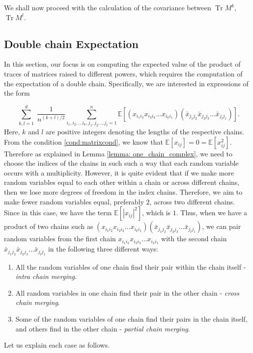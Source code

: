 \documentclass[12pt]{amsart}
\theoremstyle{plain}
\theoremstyle{definition}
\newcommand{\Tr}{\operatorname{Tr}}
\begin{document}
We shall now proceed with the calculation of the covariance between $\Tr M^{k}$, $\Tr M^{l}.$


\subsection{Double chain Expectation}\label{sec: double chain expectation}
In this section, our focus is on computing the expected value of the product of traces of matrices raised to different powers, which requires the computation of the expectation of a double chain. Specifically, we are interested in expressions of the form

$$
\sum_{\substack{ k,l=1 }}^d \frac{1}{n^{(k+l)/2}} \sum_{{i_{1},i_{2},\dots i_{k} , j_{1}, j_{2}, \dots j_{l}=1}}^{n} \mathbb{E}\left[(x_{i_{1}i_{2}}x_{i_{2}i_{3}}\dots x_{i_{k}i_{1}})(\bar x_{j_{1}j_{2}}\bar x_{j_{2}j_{3}}\dots \bar x_{j_{l}j_{1}})\right].
$$
Here, $k$ and $l$ are positive integers denoting the lengths of the respective chains. From the condition \ref{cond:matrixcond}, we know that $\mathbb{E}[x_{ij}]=0=\mathbb{E}[x_{ij}^{2}].$ Therefore as explained in Lemma \ref{lemma: one_chain_complex}, we need to choose the indices of the chains in such such a way that each random variable occurs with a multiplicity. However, it is quite evident that if we make more random variables equal to each other within a chain or across different chains, then we lose more degrees of freedom in the index chains. Therefore, we aim to make fewer random variables equal, preferably $2$, across two different chains. Since in this case, we have the term $\mathbb{E}[|x_{ij}|^2]$, which is $1$. Thus, when we have a product of two chains such as $(x_{i_{1}i_{2}}x_{i_{2}i_{3}}\dots x_{i_{k}i_{1}})(\bar x_{j_{1}j_{2}}\bar x_{j_{2}j_{3}}\dots \bar x_{j_{l}j_{1}})$, we can pair random variables from the first chain $x_{i_{1}i_{2}}x_{i_{2}i_{3}}\dots x_{i_{k}i_{1}}$ with the second chain $\bar x_{j_{1}j_{2}}\bar x_{j_{2}j_{3}}\dots \bar x_{j_{l}j_{1}}$ in the following three different ways:
\begin{enumerate}
    \item All the random variables of one chain find their pair within the chain itself - \textit{intra chain merging}.
    \item All random variables in one chain find their pair in the other chain - \textit{cross chain merging}.
    \item Some of the random variables of one chain find their pairs in the chain itself, and others find in the other chain - \textit{partial chain merging}.
\end{enumerate}
Let us explain each case as follows.
\end{document}
